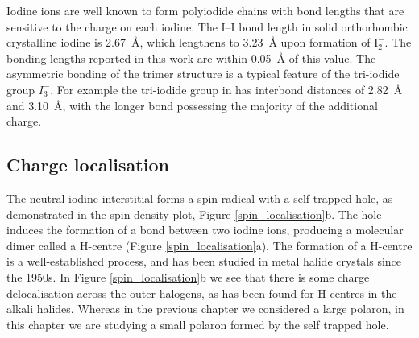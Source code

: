 Iodine ions are well known to form polyiodide chains with bond lengths that are sensitive to the charge on each iodine.
The I--I bond length in solid orthorhombic crystalline iodine is \SI{2.67}{\angstrom}, which lengthens to \SI{3.23}{\angstrom} upon formation of $\mathrm{I}_2^-$.\autocite{Chen1985} The bonding lengths reported in this work are within \SI{0.05}{\angstrom} of this value.
The asymmetric bonding of the trimer structure is a typical feature of the tri-iodide group $I_3^-$. For example the tri-iodide group in  has interbond distances of \SI{2.82}{\angstrom} and \SI{3.10}{\angstrom}, with the longer bond possessing the majority of the additional charge.\autocite{Finney1973}

\subsection{Charge localisation} \label{ss:chglocal}
The neutral iodine interstitial forms a spin-radical with a self-trapped hole, as demonstrated in the spin-density plot, Figure \ref{spin_localisation}b.
The hole induces the formation of a bond between two iodine ions, producing a molecular dimer called a H-centre (Figure \ref{spin_localisation}a). The formation of a H-centre is a well-established process, and has been studied in metal halide crystals since the 1950s.\autocite{Castner1957} In Figure \ref{spin_localisation}b we see that there is some charge delocalisation across the outer halogens, as has been found for H-centres in the alkali halides.\autocite{Shluger1995}
Whereas in the previous chapter we considered a large polaron, in this chapter we are studying a small polaron formed by the self trapped hole.

